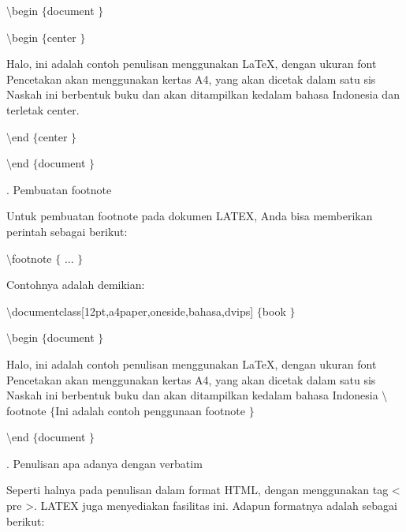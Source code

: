 {\fontsize{10pt}{10pt}\selectfont  $  \setminus  $begin $  \{  $document $  \}  $} \par
{\fontsize{10pt}{10pt}\selectfont  $  \setminus  $begin $  \{  $center $  \}  $} \par
\vspace{9pt}
{\fontsize{10pt}{10pt}\selectfont Halo, ini adalah contoh penulisan menggunakan LaTeX, dengan ukuran font Pencetakan akan menggunakan kertas A4, yang akan dicetak dalam satu sis Naskah ini berbentuk buku dan akan ditampilkan kedalam bahasa Indonesia dan terletak center.} \par
\vspace{9pt}
{\fontsize{10pt}{10pt}\selectfont  $  \setminus  $end $  \{  $center $  \}  $} \par
{\fontsize{10pt}{10pt}\selectfont  $  \setminus  $end $  \{  $document $  \}  $} \par
\vspace{14pt}
. Pembuatan footnote \par
Untuk pembuatan footnote pada dokumen LATEX, Anda bisa memberikan perintah sebagai berikut:  \par
\vspace{12pt}
{\fontsize{10pt}{10pt}\selectfont  $  \setminus  $footnote $  \{  $ ...  $  \}  $} \par
\vspace{12pt}
Contohnya adalah demikian: \par
{\fontsize{10pt}{10pt}\selectfont  $  \setminus  $documentclass[12pt,a4paper,oneside,bahasa,dvips] $  \{  $book $  \}  $} \par
{\fontsize{10pt}{10pt}\selectfont  $  \setminus  $begin $  \{  $document $  \}  $} \par
\vspace{12pt}
{\fontsize{10pt}{10pt}\selectfont Halo, ini adalah contoh penulisan menggunakan LaTeX, dengan ukuran font Pencetakan akan menggunakan kertas A4, yang akan dicetak dalam satu sis Naskah ini berbentuk buku dan akan ditampilkan kedalam bahasa Indonesia  $  \setminus  $footnote $  \{  $Ini adalah contoh penggunaan footnote $  \}  $} \par
\vspace{9pt}
{\fontsize{10pt}{10pt}\selectfont  $  \setminus  $end $  \{  $document $  \}  $} \par
\vspace{10pt}
. Penulisan apa adanya dengan verbatim \par
Seperti halnya pada penulisan dalam format HTML, dengan menggunakan tag < pre >. LATEX juga menyediakan fasilitas ini. Adapun formatnya adalah sebagai berikut: \par
